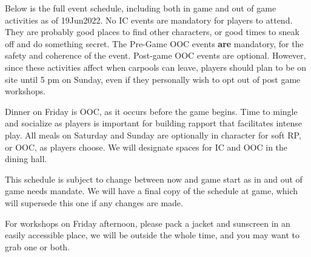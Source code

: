 \documentclass[green]{GL2020}
\begin{document}
\name{\gWeekendSchedule{}}

Below is the full event schedule, including both in game and out of game activities as of 19Jun2022. No IC events are mandatory for players to attend. They are probably good places to find other characters, or good times to sneak off and do something secret. The Pre-Game OOC events \textbf{are} mandatory, for the safety and coherence of the event. Post-game OOC events are optional. However, since these activities affect when carpools can leave, players should plan to be on site until 5 pm on Sunday, even if they personally wish to opt out of post game workshops.

Dinner on Friday is OOC, as it occurs before the game begins. Time to mingle and socialize as players is important for building rapport that facilitates intense play. All meals on Saturday and Sunday are optionally in character for soft RP, or OOC, as players choose. We will designate spaces for IC and OOC in the dining hall.

This schedule is subject to change between now and game start as in and out of game needs mandate. We will have a final copy of the schedule at game, which will supersede this one if any changes are made.


For workshops on Friday afternoon, please pack a jacket and sunscreen in an easily accessible place, we will be outside the whole time, and you may want to grab one or both.
\end{document}
